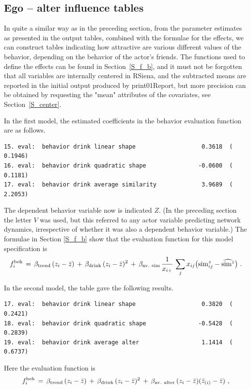 \documentclass[a4paper,fleqn,11pt]{article}
\newcommand{\+}{\, + \,}
\newcommand{\sfn}[1]{\textsf{#1}}
\newcommand{\rs}{{\sf RSiena}}
\begin{document}
\subsection{Ego -- alter influence tables}

In quite a similar way as in the preceding section,
from the parameter estimates as presented in the
output tables, combined with the formulae for the effects,
we can construct tables indicating how attractive are
various different values of the behavior,
depending on the behavior of the actor's friends.
The functions used to define the effects can be found
in Section~\ref{S_f_b}, and it must not be forgotten that all variables
are internally centered in \rs, and the subtracted means are reported
in the initial output produced by \sfn{print01Report},
but more precision can be obtained by requesting the \textsf{"mean"}
attributes of the covariates, see Section~\ref{S_center}.

In the first model, the estimated coefficients in the
behavior evaluation function are as follows.

{\footnotesize
\begin{verbatim}
15. eval:  behavior drink linear shape                   0.3618  (   0.1946)
16. eval:  behavior drink quadratic shape               -0.0600  (   0.1181)
17. eval:  behavior drink average similarity             3.9689  (   2.2053)
\end{verbatim}
}
The dependent behavior variable now is indicated $Z$. (In the preceding
section the letter $V$ was used, but this referred to any actor variable
predicting network dynamics,
irrespective of whether it was also a dependent behavior variable.)
The formulae in Section \ref{S_f_b} show that the evaluation function
for this model specification is
\begin{equation}
   f^{\rm beh}_i \,=\, \beta_{\rm trend} \, (z_i - \bar z)
               \,+\, \beta_{\rm drink} \, (z_i - \bar z)^2 \,+\,
                 \beta_{\rm av.\ sim}\,  \frac{1}{x_{i+}} \,
          \sum_j x_{ij} \big({\rm sim}^z_{ij} - \widehat{{\rm sim}^z}\big) \ .
                    \label{eq_f_b1}
\end{equation}

\noindent
In the second model, the table gave the following results.

{\footnotesize
\begin{verbatim}
17. eval:  behavior drink linear shape                   0.3820  (   0.2421)
18. eval:  behavior drink quadratic shape               -0.5428  (   0.2839)
19. eval:  behavior drink average alter                  1.1414  (   0.6737)
\end{verbatim}
}
\noindent
Here the evaluation function is
\begin{equation}
   f^{\rm beh}_i \,=\, \beta_{\rm trend} \, (z_i - \bar z)
           \,+\, \beta_{\rm drink} \, (z_i - \bar z)^2 \,+\,
          \beta_{\rm av.\ alter}\,  (z_i - \bar z)(\bar z_{(i)} - \bar z)  \ ,
                    \label{eq_f_b2}
\end{equation}
\end{document}
